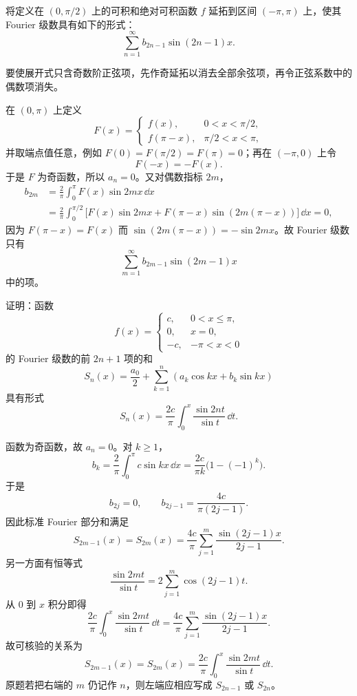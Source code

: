 \begin{xexercise}[2]
将定义在 $(0,\pi/2)$ 上的可积和绝对可积函数 $f$ 延拓到区间 $(-\pi,\pi)$ 上，使其 Fourier 级数具有如下的形式：
  \[
    \sum_{n=1}^{\infty}b_{2n-1}\sin(2n-1)x.
  \]
\end{xexercise}
\begin{xsolution}
要使展开式只含奇数阶正弦项，先作奇延拓以消去全部余弦项，再令正弦系数中的偶数项消失。

在 $(0,\pi)$ 上定义
\[
  F(x)=
  \begin{cases}
    f(x),&0<x<\pi/2,\\
    f(\pi-x),&\pi/2<x<\pi,
  \end{cases}
\]
并取端点值任意，例如 $F(0)=F(\pi/2)=F(\pi)=0$；再在 $(-\pi,0)$ 上令
\[
  F(-x)=-F(x).
\]
于是 $F$ 为奇函数，所以 $a_n=0$。又对偶数指标 $2m$，
\begin{align*}
  b_{2m}
  &=\frac2\pi\int_0^\pi F(x)\sin2mx\,\dd x\\
  &=\frac2\pi\int_0^{\pi/2}
  \bigl[F(x)\sin2mx+F(\pi-x)\sin(2m(\pi-x))\bigr]\,\dd x=0,
\end{align*}
因为 $F(\pi-x)=F(x)$ 而
$\sin(2m(\pi-x))=-\sin2mx$。故 Fourier 级数只有
\[
  \sum_{m=1}^{\infty}b_{2m-1}\sin(2m-1)x
\]
中的项。
\end{xsolution}


\begin{xexercise}[3]
证明：函数
  \[
    f(x)=\begin{cases}
      c,&0<x\le\pi,\\
      0,&x=0,\\
      -c,&-\pi<x<0
    \end{cases}
  \]
  的 Fourier 级数的前 $2n+1$ 项的和
  \[
    S_n(x)=\frac{a_0}{2}+\sum_{k=1}^{n}(a_k\cos kx+b_k\sin kx)
  \]
  具有形式
  \[
    S_n(x)=\frac{2c}{\pi}\int_0^x\frac{\sin2nt}{\sin t}\,\dd t.
  \]
\end{xexercise}
\begin{xsolution}
函数为奇函数，故 $a_n=0$。对 $k\ge1$，
\[
  b_k=\frac2\pi\int_0^\pi c\sin kx\,\dd x
  =\frac{2c}{\pi k}\bigl(1-(-1)^k\bigr).
\]
于是
\[
  b_{2j}=0,\qquad b_{2j-1}=\frac{4c}{\pi(2j-1)}.
\]
因此标准 Fourier 部分和满足
\[
  S_{2m-1}(x)=S_{2m}(x)
  =\frac{4c}{\pi}\sum_{j=1}^{m}\frac{\sin(2j-1)x}{2j-1}.
\]
另一方面有恒等式
\[
  \frac{\sin2mt}{\sin t}=2\sum_{j=1}^{m}\cos(2j-1)t.
\]
从 $0$ 到 $x$ 积分即得
\[
  \frac{2c}{\pi}\int_0^x\frac{\sin2mt}{\sin t}\,\dd t
  =\frac{4c}{\pi}\sum_{j=1}^{m}\frac{\sin(2j-1)x}{2j-1}.
\]
故可核验的关系为
\[
  \boxed{\displaystyle
  S_{2m-1}(x)=S_{2m}(x)
  =\frac{2c}{\pi}\int_0^x\frac{\sin2mt}{\sin t}\,\dd t }.
\]
原题若把右端的 $m$ 仍记作 $n$，则左端应相应写成 $S_{2n-1}$ 或 $S_{2n}$。
\end{xsolution}


